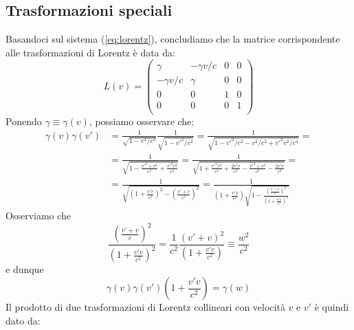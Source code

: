 \documentclass[a4paper,11pt]{book}
\theoremstyle{plain}
\theoremstyle{definition}
\begin{document}
\subsection{Trasformazioni speciali}
Basandoci sul sistema (\ref{eq:lorentz}), concludiamo che la matrice corrispondente alle trasformazioni di Lorentz è data da:
\[
L(v)=
\left(
\begin{array}{cccc}
\gamma & -\gamma v/c & 0 & 0 \\
-\gamma v/c & \gamma & 0 & 0 \\
0 & 0 & 1 & 0 \\
0 & 0 & 0 & 1 \\
\end{array} \right)
\]
Ponendo $\gamma\equiv \gamma(v)$, possiamo osservare che:
\begin{align*}
\gamma(v)\gamma(v')&=\frac{1}{\sqrt{1-v^2/c^2}}\frac{1}{\sqrt{1-v'^2/c^2}}=\frac{1}{\sqrt{1-v'^2/c^2-v^2/c^2+v'^2v^2/c^4}}= \\
&=\frac{1}{\sqrt{1-\frac{v'^2+v^2}{c^2}+\frac{v'^2v^2}{c^4}}}= \frac{1}{\sqrt{1+\frac{v'^2v^2}{c^4}+\frac{2v'v}{c^2}-\frac{v'^2+v^2}{c^2}-\frac{2v'v}{c^2}}}= \\
&= \frac{1}{\sqrt{\left( 1+\frac{v'v}{c^2} \right)^2-\left( \frac{v'+v}{c^2} \right)^2}}=\frac{1}{\left( 1+\frac{v'v}{c^2} \right)\sqrt{1-\frac{\left( \frac{v'+v}{c} \right)^2}{\left( 1+\frac{v'v}{c^2} \right)^2}}}
\end{align*}
Osserviamo che
\[
\frac{\left( \frac{v'+v}{c} \right)^2}{\left( 1+\frac{v'v}{c^2} \right)^2}=\frac{1}{c^2}\frac{(v'+v)^2}{(1+\frac{v'v}{c^2})}\equiv \frac{w^2}{c^2}
\]
e dunque
\[
\gamma(v)\gamma(v')\left( 1+\frac{v'v}{c^2} \right)=\gamma(w)
\]
Il prodotto di due trasformazioni di Lorentz collineari con velocità $v$ e $v'$ è quindi dato da:
\end{document}
